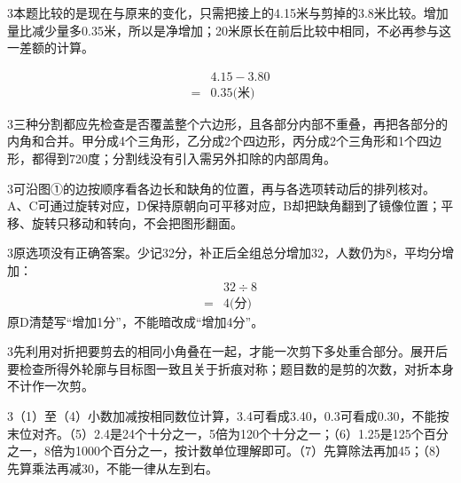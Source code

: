 \documentclass[multi=snippet,border={5bp 20bp 5bp 5bp}]{standalone}
\newenvironment{snippet}[3]{\begin{minipage}{#1bp}\color{answerred}\fontsize{#2}{#3}\selectfont\raggedright}{\end{minipage}}
\begin{document}
\begin{snippet}{505}{11.5}{14}\begin{multicols}{3}\raggedcolumns 本题比较的是现在与原来的变化，只需把接上的4.15米与剪掉的3.8米比较。增加量比减少量多0.35米，所以是净增加；20米原长在前后比较中相同，不必再参与这一差额的计算。\par \[\begin{aligned}&4.15-3.80\\={}&0.35\text{(米)}\end{aligned}\]\end{multicols}\end{snippet}
\begin{snippet}{505}{11.5}{14}\begin{multicols}{3}\raggedcolumns 三种分割都应先检查是否覆盖整个六边形，且各部分内部不重叠，再把各部分的内角和合并。甲分成4个三角形，乙分成2个四边形，丙分成2个三角形和1个四边形，都得到720度；分割线没有引入需另外扣除的内部周角。\end{multicols}\end{snippet}
\begin{snippet}{505}{11.5}{14}\begin{multicols}{3}\raggedcolumns 可沿图①的边按顺序看各边长和缺角的位置，再与各选项转动后的排列核对。A、C可通过旋转对应，D保持原朝向可平移对应，B却把缺角翻到了镜像位置；平移、旋转只移动和转向，不会把图形翻面。\end{multicols}\end{snippet}
\begin{snippet}{505}{11.5}{14}\begin{multicols}{3}\raggedcolumns 原选项没有正确答案。少记32分，补正后全组总分增加32，人数仍为8，平均分增加：\[\begin{aligned}&32\div8\\={}&4\text{(分)}\end{aligned}\]原D清楚写“增加1分”，不能暗改成“增加4分”。\end{multicols}\end{snippet}
\begin{snippet}{505}{11.5}{14}\begin{multicols}{3}\raggedcolumns 先利用对折把要剪去的相同小角叠在一起，才能一次剪下多处重合部分。展开后要检查所得外轮廓与目标图一致且关于折痕对称；题目数的是剪的次数，对折本身不计作一次剪。\end{multicols}\end{snippet}
\begin{snippet}{505}{11.5}{14}\begin{multicols}{3}\raggedcolumns （1）至（4）小数加减按相同数位计算，3.4可看成3.40，0.3可看成0.30，不能按末位对齐。（5）2.4是24个十分之一，5倍为120个十分之一；（6）1.25是125个百分之一，8倍为1000个百分之一，按计数单位理解即可。（7）先算除法再加45；（8）先算乘法再减30，不能一律从左到右。\end{multicols}\end{snippet}
\end{document}
